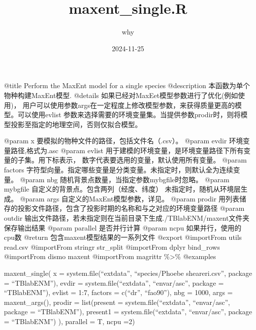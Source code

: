 \documentclass[
]{article}
\title{maxent\_single.R}
\author{why}
\date{2024-11-25}
\begin{document}
\maketitle

@title Perform the MaxEnt model for a single species @description
本函数为单个物种构建MaxEnt模型. @details
如果已经对MaxEet模型参数进行了优化(例如使用)，
用户可以使用参数args在一定程度上修改模型参数，来获得质量更高的模型。可以使用evlist
参数来选择需要的环境变量集。当提供参数prodir时，则将模型投影至指定的地理空间，否则仅拟合模型。

@param x 要模拟的物种文件的路径，包括文件名（.csv）。 @param evdir
环境变量路径,格式为.asc @param evlist
用于建模的环境变量，是环境变量路径下所有变量的子集。用下标表示，
数字代表要选用的变量，默认使用所有变量。 @param factors
字符型向量。指定哪些变量是分类变量。未指定时，则默认全为连续变量。
@param nbg 随机背景点数量，当指定参数mybgfile时忽略。 @param mybgfile
自定义的背景点。包含两列（经度、纬度） 未指定时，随机从环境层生成。
@param args
自定义的MaxEnt模型参数，详见。 @param
prodir
用列表储存的投影文件路径，包含了投影时期的名称和与之对应的环境变量路径
@param outdir
输出文件路径，若未指定则在当前目录下生成./TBlabENM/maxent文件夹保存输出结果
@param parallel 是否并行计算 @param ncpu 如果并行，使用的cpu数 @return
包含maxent模型结果的一系列文件 @export @importFrom utils read.csv
@importFrom stringr str\_split @importFrom dplyr bind\_rows @importFrom
dismo maxent @importFrom magrittr \%\textgreater\% @examples

maxent\_single( x = system.file(``extdata'', ``species/Phoebe
sheareri.csv'', package = ``TBlabENM''), evdir =
system.file(``extdata'', ``envar/asc'', package = ``TBlabENM''), evlist
= 1:7, factors = c(``dr'', ``fao90''), nbg = 1000, args =
maxent\_args(), prodir = list(present = system.file(``extdata'',
``envar/asc'', package = ``TBlabENM''), present1 =
system.file(``extdata'', ``envar/asc'', package = ``TBlabENM'') ),
parallel = T, ncpu =2)
\end{document}
